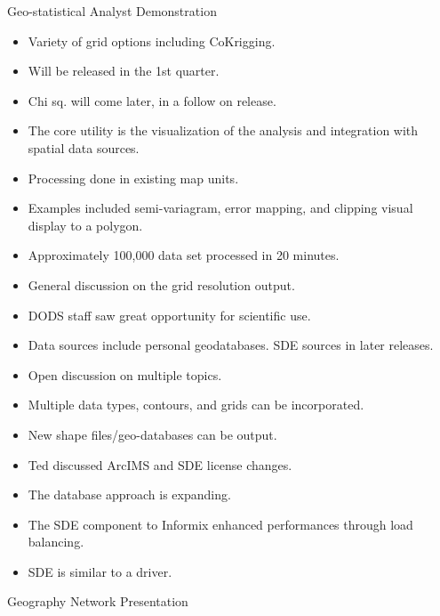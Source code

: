 Geo-statistical Analyst Demonstration

\begin{itemize}
\item Variety of grid options including CoKrigging.
\item Will be released in the 1st quarter.
\item Chi sq. will come later, in a follow on release.
\item The core utility is the visualization of the analysis and integration with spatial data 
sources.
\item Processing done in existing map units.
\item Examples included semi-variagram, error mapping, and clipping visual display to a 
polygon.
\item Approximately 100,000 data set processed in 20 minutes.
\item General discussion on the grid resolution output.
\item DODS staff saw great opportunity for scientific use.
\item Data sources include personal geodatabases. SDE sources in later releases.
\item Open discussion on multiple topics.
\item Multiple data types, contours, and grids can be incorporated.
\item New shape files/geo-databases can be output.
\item Ted discussed ArcIMS and SDE license changes.
\item The database approach is expanding.
\item The SDE component to Informix enhanced performances through load balancing.
\item SDE is similar to a driver.
\end{itemize}


Geography Network Presentation

